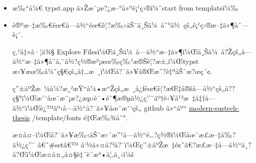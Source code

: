 \begin{itemize}
\item
  æ‰``å¼€ typst.app ä»Žæ¨¡æ?¿æ--°å»ºé¡¹ç›®ï¼ˆstart from templateï¼‰
\item
  è®ºæ--‡æ‰€éœ€å­---ä½``éœ€è¦?æ‰‹åŠ¨ä¸Šä¼~åˆ°ä½~çš„é¡¹ç›®æ--‡ä»¶åˆ---è¡¨.

  ç‚¹å‡»å·¦ä¾§ Explore
  Filesï¼Œä¸Šä¼~å­---ä½``æ--‡ä»¶ï¼Œä¸Šä¼~å?Žçš„å­---ä½``æ--‡ä»¶å­˜å‚¨ä½?ç½®æ²¡æœ‰ç‰¹æ®Šè¦?æ±‚ï¼Œtypst
  æ‹¥æœ‰ä¼˜ç§€çš„å†\ldots æ~¸ï¼Œå?¯ä»¥å®Œæˆ?è‡ªåŠ¨æ?œç´¢.

  ç''±äºŽæ~¼å¼?æ¸²æŸ``å¼•æ``Žçš„æ~¸å¿ƒéœ€è¦?æŒ‡å®šå­---ä½``çš„å??ç§°ï¼Œæˆ`åœ¨æ¨¡æ?¿æµ‹è¯•é˜¶æ®µä½¿ç''¨äº†è‹¥å¹²æ~‡å‡†å­---ä½``ï¼Œè¿™äº›å­---ä½``å?¯ä»¥åœ¨æˆ`çš„
  github ä»``åº``
  \href{https://github.com/Duolei-Wang/modern-sustech-thesis}{modern-sustech-thesis}
  /template/fonts é‡Œæ‰¾åˆ°.

  æ­¤å¤--ï¼Œå?¯ä»¥æ‰‹åŠ¨æ›´æ''¹å­---ä½``é\ldots?ç½®ï¼Œåœ¨æ­£æ--‡å‰?ä½¿ç''¨
  â€˜\#setâ€™
  å`½ä»¤å?³å?¯ï¼Œç''±äºŽæ~‡é¢˜ã€?æ­£æ--‡å­---ä½``ä¸?å?Œï¼Œæ­¤å¤„å¤§è‡´è¯­æ³•å¦‚ä¸‹ï¼š
\end{itemize}

\begin{Shaded}
\begin{Highlighting}[]
\NormalTok{    )}
\NormalTok{    align(center)[}
\NormalTok{    ]}
\NormalTok{  \}}

\NormalTok{      )}
\NormalTok{  \}}

\NormalTok{      )}
\NormalTok{  \}}

\end{Highlighting}
\end{Shaded}

